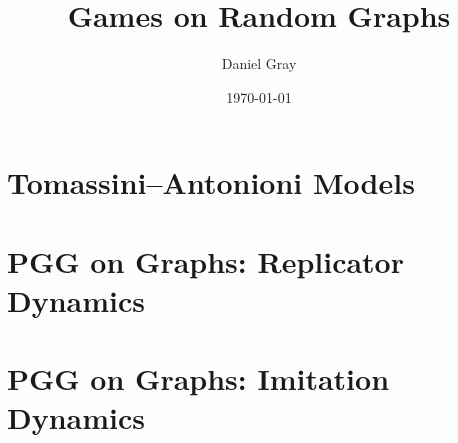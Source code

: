 \documentclass[12pt,twoside]{report}
\title{Games on Random Graphs}
\author{Daniel Gray}
\date{\today}
\begin{document}


%




\tableofcontents




%
\chapter{Tomassini--Antonioni Models} \label{TA}


\chapter{PGG on Graphs: Replicator Dynamics} 
\label{Chapter:Rep}

\chapter{PGG on Graphs: Imitation Dynamics} 
%

\label{CA}
%

%

\appendix
%

\printbibliography
\end{document}
